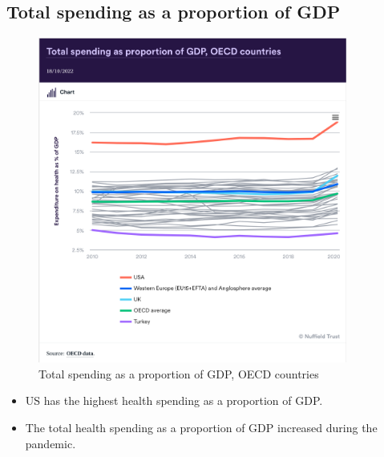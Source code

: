         \subsection{Total spending as a proportion of GDP}
            \begin{figure}[H]%
                \centering
                \includegraphics[width=4in]{images/ch3/3 GDP.png}
                \caption{Total spending as a proportion of GDP, OECD countries}
                \label{fig:label}
            \end{figure}            
\begin{itemize}
        \item US has the highest health spending as a proportion of GDP.
        \item The total health spending as a proportion of GDP increased during the pandemic.
        \end{itemize}
        
